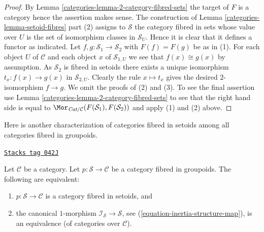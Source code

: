 \begin{proof}

By
Lemma \ref{categories-lemma-2-category-fibred-sets}
the target of $F$ is a category hence the assertion makes sense.
The construction of
Lemma \ref{categories-lemma-setoid-fibres} part (2)
assigns to $\mathcal{S}$ the category fibred in sets whose value over
$U$ is the set of isomorphism classes in $\mathcal{S}_U$. Hence it
is clear that it defines a functor as indicated.
Let $f, g : \mathcal{S}_1 \to \mathcal{S}_2$
with $F(f) = F(g)$ be as in (1). For each object $U$ of $\mathcal{C}$
and each object $x$ of $\mathcal{S}_{1, U}$ we see that $f(x) \cong g(x)$
by assumption. As $\mathcal{S}_2$ is fibred in setoids there exists
a unique isomorphism $t_x : f(x) \to g(x)$ in $\mathcal{S}_{2, U}$.
Clearly the rule $x \mapsto t_x$ gives the desired $2$-isomorphism
$f \to g$. We omit the proofs of (2) and (3).
To see the final assertion use
Lemma \ref{categories-lemma-2-category-fibred-sets}
to see that the right hand side is equal to
$\Mor_{\textit{Cat}/\mathcal{C}}(F(\mathcal{S}_1), F(\mathcal{S}_2))$
and apply (1) and (2) above.
\end{proof}

Here is another characterization of categories fibred in setoids
among all categories fibred in groupoids.

\begin{lemma}
\label{categories-lemma-characterize-fibred-setoids-inertia}
\href{https://stacks.math.columbia.edu/tag/042J}{\texttt{Stacks tag 042J}}

Let $\mathcal{C}$ be a category.
Let $p : \mathcal{S} \to \mathcal{C}$ be a category fibred in groupoids.
The following are equivalent:
\begin{enumerate}
\item $p : \mathcal{S} \to \mathcal{C}$ is a category fibred in setoids, and
\item the canonical $1$-morphism $\mathcal{I}_\mathcal{S} \to \mathcal{S}$,
see (\ref{equation-inertia-structure-map}), is an equivalence (of categories
over $\mathcal{C}$).
\end{enumerate}
\end{lemma}

